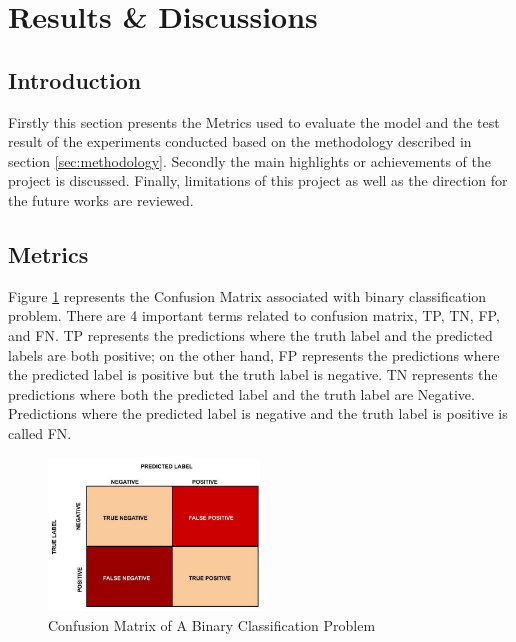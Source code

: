 \documentclass[twoside,11pt,a4paper]{article}
\begin{document}
\section{Results \& Discussions}\label{sec:results_discussions}

\subsection{Introduction}
Firstly this section presents the Metrics used to evaluate the model and the test result of the experiments conducted based on the methodology described in section \ref{sec:methodology}. Secondly the main highlights or achievements of the project is discussed. Finally, limitations of this project as well as the direction for the future works are reviewed.\\
\subsection{Metrics}
Figure \ref{fig:confusion_matrix} represents the Confusion Matrix associated with binary classification problem. There are 4 important terms related to confusion matrix, \acf{TP}, \acf{TN}, \acf{FP}, and \acf{FN}. \acs{TP} represents the predictions where the truth label and the predicted labels are both positive; on the other hand, \acs{FP} represents the predictions where the  predicted label is positive but the truth label is negative. \acs{TN} represents the predictions where both the predicted label and the truth label are Negative. Predictions where the predicted label is negative and the truth label is positive is called \acs{FN}.\\
\begin{figure}[ht]
	\centering
	\includegraphics[width=0.5\textwidth]{confusion_matrix}
	\caption[Confusion Matrix of A Binary Classification Problem]{Confusion Matrix of A Binary Classification Problem\citep{confusion_matrix}}
	\label{fig:confusion_matrix}
\end{figure}
\end{document}
